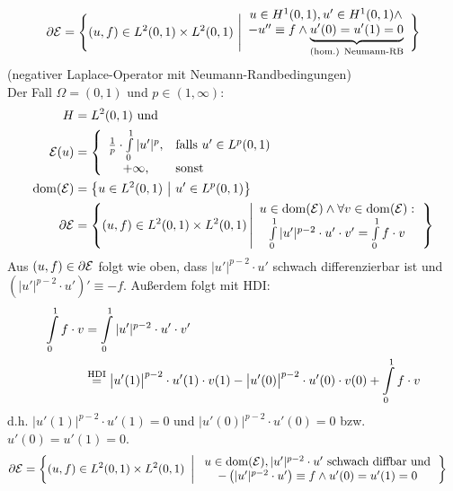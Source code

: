 \begin{beispiel}
\begin{align*}
		\partial\mathcal{E}=\Bigg\lbrace(u,f)\in L^2(0,1)\times L^2(0,1)~\Bigg|
		\begin{array}{c}
			u\in H^1(0,1),u'\in H^1(0,1)\wedge\\
			-u''\equiv f\wedge \underbrace{u'(0)=u'(1)=0}_{\text{(hom.) Neumann-RB}}
		\end{array}
		\Bigg\rbrace
	\end{align*}
	(negativer Laplace-Operator mit Neumann-Randbedingungen)\\
	Der Fall $\Omega=(0,1)$ und $p\in(1,\infty)$:
	\begin{align*}
		H&=L^2(0,1)\text{ und }\\
		\mathcal{E}(u)&=\left\lbrace\begin{array}{cl}
			\frac{1}{p}\cdot\int\limits_0^1 |u'|^p, &\text{falls } u'\in L^p(0,1)\\
			+\infty, &\text{sonst }
		\end{array}\right.\\
		\operatorname{dom}(\mathcal{E})&=\big\lbrace u\in L^2(0,1)~\big|~u'\in L^p(0,1)\big\rbrace\\
		\partial\mathcal{E}&=\left\lbrace(u,f)\in L^2(0,1)\times L^2(0,1)\left|
		\begin{array}{c}
			u\in\operatorname{dom}(\mathcal{E})\wedge\forall v\in\operatorname{dom}(\mathcal{E}):\\
			\int\limits_0^1|u'|^{p-2}\cdot u'\cdot v'=\int\limits_0^1 f\cdot v
		\end{array}
		\right.\right\rbrace
	\end{align*}
	Aus $(u,f)\in\partial\mathcal{E}$ folgt wie oben, dass $|u'|^{p-2}\cdot u'$ schwach differenzierbar ist und\\ $\left(|u'|^{p-2}\cdot u'\right)'\equiv -f$. 
	Außerdem folgt mit HDI:
	\begin{align*}
		\int\limits_0^1 f\cdot v
		&=\int\limits_0^1|u'|^{p-2}\cdot u'\cdot v'\\
		&\overset{\text{HDI}}{=}
		\big| u'(1)\big|^{p-2}\cdot u'(1)\cdot v(1)-
		\big| u'(0)\big|^{p-2}\cdot u'(0)\cdot v(0)+\int\limits_0^1 f\cdot v
	\end{align*}
	d.h. $\big|u'(1)\big|^{p-2}\cdot u'(1)=0$ und $\big|u'(0)\big|^{p-2}\cdot u'(0)=0$ bzw. $u'(0)=u'(1)=0$.
	\begin{align*}
		\partial\E&=\left\lbrace(u,f)\in L^2(0,1)\times L^2(0,1)~\left|~
		\begin{array}{c}
			u\in\dom(\E),|u'|^{p-2}\cdot u'\text{ schwach diffbar und}\\
			-\left(|u'|^{p-2}\cdot u'\right)\equiv f\wedge u'(0)=u'(1)=0
		\end{array}
		\right.\right\rbrace

\end{align*}
\end{beispiel}

